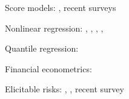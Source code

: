 \documentclass{article}
\theoremstyle{plain}
\theoremstyle{remark}
\begin{document}
Score models: \cite{creal2013generalized}, recent surveys \cite{artemova2022scoretheory, artemova2022scoreapplications}

Nonlinear regression: \cite{huber1967behavior}, \cite{white1984nonlinear}, \cite{oberhofer1982consistency}, \cite{powell1984least}, \cite{weiss1991estimating}

Quantile regression: \cite{koenker2005quantile, koenker2017quantile}

Financial econometrics: \cite{engle2004caviar}

Elicitable risks: \cite{fissler2016higher}, \cite{gneiting2011making},  recent survey \cite{he2022risk}



\newpage



\newpage


%
\end{document}
